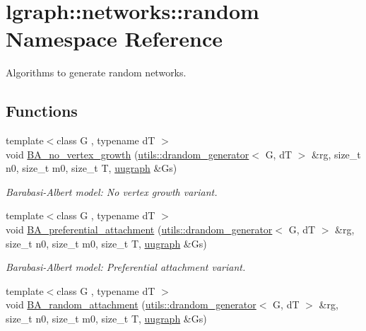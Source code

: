 \hypertarget{namespacelgraph_1_1networks_1_1random}{\section{lgraph\-:\-:networks\-:\-:random Namespace Reference}
\label{namespacelgraph_1_1networks_1_1random}
}


Algorithms to generate random networks.  


\subsection*{Functions}
\begin{DoxyCompactItemize}
\item 
{\footnotesize template$<$class G , typename d\-T $>$ }\\void \hyperlink{namespacelgraph_1_1networks_1_1random_ab7e205d59b9526aa28812c93059ec327}{B\-A\-\_\-no\-\_\-vertex\-\_\-growth} (\hyperlink{classlgraph_1_1utils_1_1drandom__generator}{utils\-::drandom\-\_\-generator}$<$ G, d\-T $>$ \&rg, size\-\_\-t n0, size\-\_\-t m0, size\-\_\-t T, \hyperlink{classlgraph_1_1uugraph}{uugraph} \&Gs)
\begin{DoxyCompactList}\small\item\em Barabasi-\/\-Albert model\-: No vertex growth variant. \end{DoxyCompactList}\item 
{\footnotesize template$<$class G , typename d\-T $>$ }\\void \hyperlink{namespacelgraph_1_1networks_1_1random_adbb7aa72c5ebdd0dc0227e0e403b6707}{B\-A\-\_\-preferential\-\_\-attachment} (\hyperlink{classlgraph_1_1utils_1_1drandom__generator}{utils\-::drandom\-\_\-generator}$<$ G, d\-T $>$ \&rg, size\-\_\-t n0, size\-\_\-t m0, size\-\_\-t T, \hyperlink{classlgraph_1_1uugraph}{uugraph} \&Gs)
\begin{DoxyCompactList}\small\item\em Barabasi-\/\-Albert model\-: Preferential attachment variant. \end{DoxyCompactList}\item 
{\footnotesize template$<$class G , typename d\-T $>$ }\\void \hyperlink{namespacelgraph_1_1networks_1_1random_ae23132af2a101beecd12bededcc8cdeb}{B\-A\-\_\-random\-\_\-attachment} (\hyperlink{classlgraph_1_1utils_1_1drandom__generator}{utils\-::drandom\-\_\-generator}$<$ G, d\-T $>$ \&rg, size\-\_\-t n0, size\-\_\-t m0, size\-\_\-t T, \hyperlink{classlgraph_1_1uugraph}{uugraph} \&Gs)

\end{DoxyCompactItemize}
